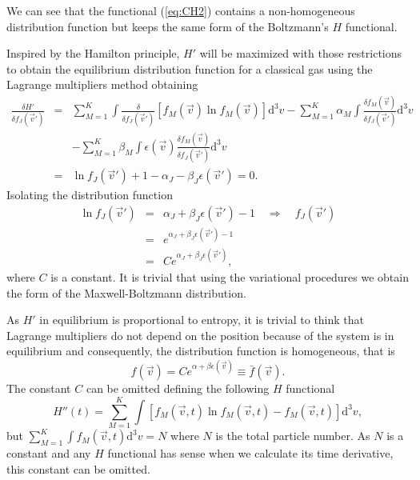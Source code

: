 We can see that the functional (\ref{eq:CH2}) contains a non-homogeneous
distribution function but keeps the same form of the Boltzmann's $H$ functional.

Inspired by the Hamilton principle, $H'$ will be maximized with those
restrictions to obtain the equilibrium distribution function for a classical gas
using the Lagrange multipliers method obtaining
%
\begin{eqnarray}
    \frac{\delta H'}{\delta f_J(\vec{v}')} & = & \sum_{M=1}^{K}\int
      \frac{\delta}{\delta f_J(\vec{v}')}\left[
        f_M(\vec{v})\ln f_M(\vec{v})
        \right]
       \mathrm{d}^3v -\sum_{M=1}^{K}\alpha_M\int
       	\frac{\delta f_M(\vec{v})}{\delta f_J(\vec{v}')}
      \mathrm{d}^3v\nonumber\\
    & & -\sum_{M=1}^{K}\beta_M\int\epsilon(\vec{v})
    	\frac{\delta f_M(\vec{v})}{\delta f_J(\vec{v}')}
      \mathrm{d}^3v \nonumber\\
    & = & \ln f_J(\vec{v}')+1-\alpha_J-\beta_J \epsilon(\vec{v}')=0.
\end{eqnarray}
%
Isolating the distribution function 
%
\begin{eqnarray}
    \ln f_J(\vec{v}') & = & \alpha_J+\beta_J \epsilon(\vec{v}')
       -1\quad\Rightarrow\quad f_J(\vec{v}')\\
    & = & e^{\alpha_J +\beta_J \epsilon(\vec{v}')-1}\nonumber\\
    & = & Ce^{\alpha_J+\beta_J \epsilon(\vec{v}') } \label{relacion1},
\end{eqnarray}
%
where $C$ is a constant. It is trivial that using the variational procedures we
obtain the form of the Maxwell-Boltzmann distribution. 

As $H'$ in equilibrium is proportional to entropy, it is trivial to think that
Lagrange multipliers do not depend on the position because of the system is in
equilibrium and consequently, the distribution function is homogeneous, that is
%
\begin{equation}
    f(\vec{v})=Ce^{\alpha+\beta \epsilon(\vec{v})}\equiv \bar{f}(\vec{v}).
\end{equation} 
%
The constant $C$ can be omitted defining the following $H$ functional
%
\begin{equation}
   H''(t)=\sum_{M=1}^{K}\int \left[f_M(\vec{v},t)
    \ln f_M(\vec{v},t)-f_M(\vec{v},t)\right]\mathrm{d}^3v  \label{CH3},
\end{equation}
%
but $\sum_{M=1}^{K} \int f_M(\vec{v},t)\mathrm{d}^3v =N$ where $N$ is the
total particle number. As $N$ is a constant and any $H$ functional has sense
when we calculate its time derivative, this constant can be omitted. 

